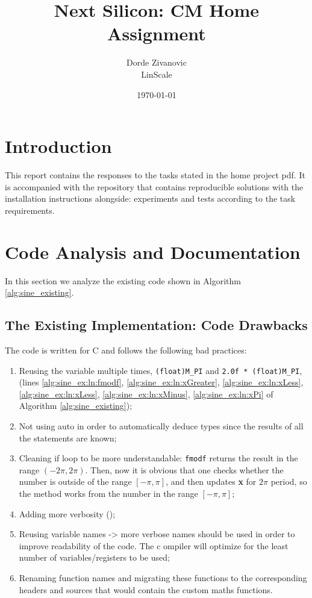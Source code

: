 \documentclass[12pt]{article}
\title{Next Silicon: CM Home Assignment}
\author{Dorde Zivanovic \\ \small{LinScale}}
\date{\today}
\begin{document}
\maketitle
\tableofcontents
\newpage

\section{Introduction}
This report contains the responses to the tasks stated in the home project pdf.
It is accompanied with the repository that contains reproducible solutions with the installation instructions alongside: experiments and tests according to the task requirements.
\section{Code Analysis and Documentation}
In this section we analyze the existing code shown in Algorithm \ref{alg:sine_existing}.

\subsection{The Existing Implementation: Code Drawbacks}
The code is written for C and follows the following bad practices:
\begin{enumerate}
    \item Reusing the variable multiple times,  \texttt{(float)M\_PI} and \texttt{2.0f * (float)M\_PI}, (lines \ref{alg:sine_ex:ln:fmodf}, \ref{alg:sine_ex:ln:xGreater}, \ref{alg:sine_ex:ln:xLess}, \ref{alg:sine_ex:ln:xLess}, \ref{alg:sine_ex:ln:xMinus}, \ref{alg:sine_ex:ln:xPi} of Algorithm \ref{alg:sine_existing});
    \item Not using auto in order to automatically deduce types since the results of all the statements are known;
    \item Cleaning if loop to be more understandable: \texttt{fmodf} returns the result in the range $(-2 \pi, 2 \pi)$. Then, now it is obvious that one checks whether the number is outside of the range $[-\pi, \pi]$, and then updates \textbf{x} for $2 \pi$ period, so the method works from the number in the range $[-\pi, \pi]$;
    \item Adding more verbosity ();
    \item Reusing variable names -> more verbose names should be used in order to improve readability of the code. The c ompiler will optimize for the least number of variables/registers to be used;
    \item Renaming function names and migrating these functions to the corresponding headers and sources that would contain the custom maths functions.
\end{enumerate}
\end{document}
